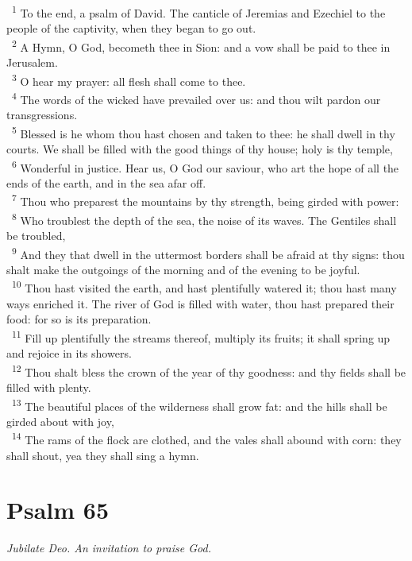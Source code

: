 \documentclass[a5paper,12pt]{article}
\begin{document}
\begin{multicols*}{2}
~\textsuperscript{1} To the end, a psalm of David. The canticle of Jeremias and Ezechiel to the people of the captivity, when they began to go out.\\
~\textsuperscript{2} A Hymn, O God, becometh thee in Sion: and a vow shall be paid to thee in Jerusalem.\\
~\textsuperscript{3} O hear my prayer: all flesh shall come to thee.\\
~\textsuperscript{4} The words of the wicked have prevailed over us: and thou wilt pardon our transgressions.\\
~\textsuperscript{5} Blessed is he whom thou hast chosen and taken to thee: he shall dwell in thy courts. We shall be filled with the good things of thy house; holy is thy temple,\\
~\textsuperscript{6} Wonderful in justice. Hear us, O God our saviour, who art the hope of all the ends of the earth, and in the sea afar off.\\
~\textsuperscript{7} Thou who preparest the mountains by thy strength, being girded with power:\\
~\textsuperscript{8} Who troublest the depth of the sea, the noise of its waves. The Gentiles shall be troubled,\\
~\textsuperscript{9} And they that dwell in the uttermost borders shall be afraid at thy signs: thou shalt make the outgoings of the morning and of the evening to be joyful.\\
~\textsuperscript{10} Thou hast visited the earth, and hast plentifully watered it; thou hast many ways enriched it. The river of God is filled with water, thou hast prepared their food: for so is its preparation.\\
~\textsuperscript{11} Fill up plentifully the streams thereof, multiply its fruits; it shall spring up and rejoice in its showers.\\
~\textsuperscript{12} Thou shalt bless the crown of the year of thy goodness: and thy fields shall be filled with plenty.\\
~\textsuperscript{13} The beautiful places of the wilderness shall grow fat: and the hills shall be girded about with joy,\\
~\textsuperscript{14} The rams of the flock are clothed, and the vales shall abound with corn: they shall shout, yea they shall sing a hymn.\\

\section{Psalm 65}
\label{sec:orgccef302}
\emph{Jubilate Deo. An invitation to praise God.}\\


\end{multicols*}
\end{document}
